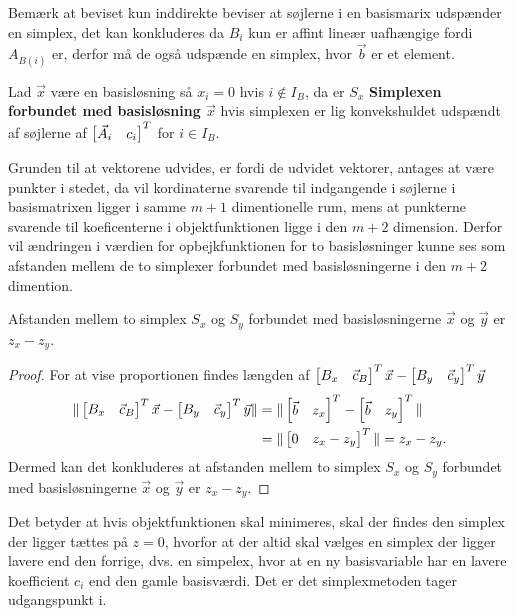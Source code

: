 Bemærk at beviset kun inddirekte beviser at søjlerne i en basismarix udspænder en simplex, det kan konkluderes da $B_i$ kun er affint lineær uafhængige fordi $A_{B(i)}$ er, derfor må de også udspænde en simplex, hvor $\vec{b}$ er et element.
\begin{defn}
Lad $\vec{x}$ være en basisløsning så $x_i = 0$ hvis $i \notin I_B$, da er $S_x$ \textbf{Simplexen forbundet med basisløsning $\vec{x}$} hvis simplexen er lig konvekshuldet udspændt af søjlerne af $\begin{bmatrix} \vec{A}_i & c_i \end{bmatrix}^T$ for $i \in I_B$.
\end{defn}
Grunden til at vektorene udvides, er fordi de udvidet vektorer, antages at være punkter i stedet, da vil kordinaterne svarende til indgangende i søjlerne i basismatrixen ligger i samme $m+1$ dimentionelle rum, mens at punkterne svarende til koeficenterne i objektfunktionen ligge i den $m+2$ dimension.  
Derfor vil ændringen i værdien for opbejkfunktionen for to basisløsninger kunne ses som afstanden mellem de to simplexer forbundet med basisløsningerne i den $m+2$ dimention.
\begin{prop}
Afstanden mellem to simplex $S_x$ og $S_y$ forbundet med basisløsningerne $\vec{x}$ og $\vec{y}$ er $z_x - z_y$.
\end{prop}
\begin{proof}
For at vise proportionen findes længden af $\begin{bmatrix} B_x & \vec{c}_B \end{bmatrix}^T \vec{x} - \begin{bmatrix} B_y & \vec{c}_y \end{bmatrix}^T \vec{y}$
\begin{align*}
 \Vert \begin{bmatrix} B_x & \vec{c}_B \end{bmatrix}^T \vec{x} - \begin{bmatrix} B_y & \vec{c}_y \end{bmatrix}^T \vec{y} \Vert & =  \Vert \begin{bmatrix} \vec{b} & z_x \end{bmatrix}^T  - \begin{bmatrix} \vec{b} & z_y \end{bmatrix}^T  \Vert
 \\ & = \Vert \begin{bmatrix} 0 & z_x - z_y \end{bmatrix}^T \Vert = z_x - z_y.
\end{align*}
Dermed kan det konkluderes at afstanden mellem to simplex $S_x$ og $S_y$ forbundet med basisløsningerne $\vec{x}$ og $\vec{y}$ er $z_x - z_y$.
\end{proof}
Det betyder at hvis objektfunktionen skal minimeres, skal der findes den simplex der ligger tættes på $z = 0$, hvorfor at der altid skal vælges en simplex der ligger lavere end den forrige, dvs. en simpelex, hvor at en ny basisvariable har en lavere koefficient $c_i$ end den gamle basisværdi.
Det er det simplexmetoden tager udgangspunkt i.

